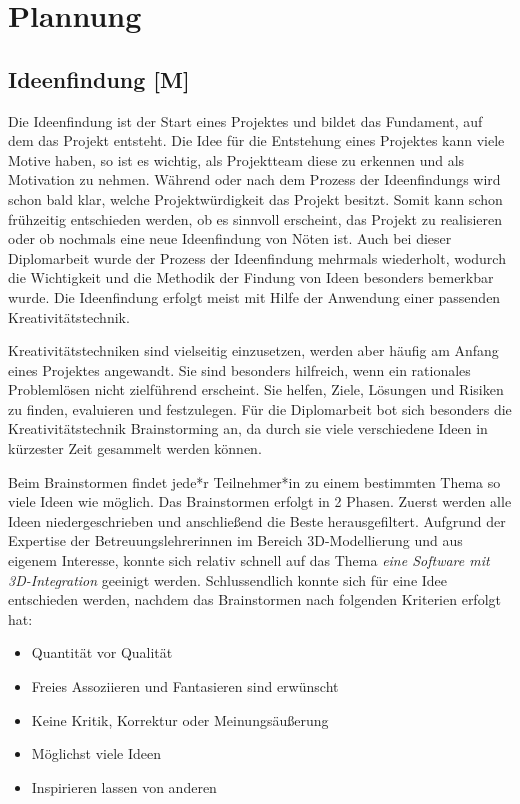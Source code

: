 \section{Plannung}

\subsection{Ideenfindung [M]}
Die Ideenfindung ist der Start eines Projektes und bildet das Fundament, auf dem das Projekt entsteht. Die Idee für die Entstehung eines Projektes kann viele Motive haben, so ist es wichtig, als Projektteam diese zu erkennen und als Motivation zu nehmen. Während oder nach dem Prozess der Ideenfindungs wird schon bald klar, welche Projektwürdigkeit das Projekt besitzt. Somit kann schon frühzeitig entschieden werden, ob es sinnvoll erscheint, das Projekt zu realisieren oder ob nochmals eine neue Ideenfindung von Nöten ist. Auch bei dieser Diplomarbeit wurde der Prozess der Ideenfindung mehrmals wiederholt, wodurch die Wichtigkeit und die Methodik der Findung von Ideen besonders bemerkbar wurde. Die Ideenfindung erfolgt meist mit Hilfe der Anwendung einer passenden Kreativitätstechnik.

Kreativitätstechniken sind vielseitig einzusetzen, werden aber häufig am Anfang eines Projektes angewandt. Sie sind besonders hilfreich, wenn ein rationales Problemlösen nicht zielführend erscheint. Sie helfen, Ziele, Lösungen und Risiken zu finden, evaluieren und festzulegen. Für die Diplomarbeit bot sich besonders die Kreativitätstechnik Brainstorming an, da durch sie viele verschiedene Ideen in kürzester Zeit gesammelt werden können.

Beim Brainstormen findet jede*r Teilnehmer*in zu einem bestimmten Thema so viele Ideen wie möglich. Das Brainstormen erfolgt in 2 Phasen. Zuerst werden alle Ideen niedergeschrieben und anschließend die Beste herausgefiltert. Aufgrund der Expertise der Betreuungslehrerinnen im Bereich 3D-Modellierung und aus eigenem Interesse, konnte sich relativ schnell auf das Thema \emph{eine Software mit 3D-Integration} geeinigt werden. Schlussendlich konnte sich für eine Idee entschieden werden, nachdem das Brainstormen nach folgenden Kriterien erfolgt hat:
\begin{itemize}
    \item Quantität vor Qualität
    \item Freies Assoziieren und Fantasieren sind erwünscht
    \item Keine Kritik, Korrektur oder Meinungsäußerung
    \item Möglichst viele Ideen
    \item Inspirieren lassen von anderen
\end{itemize}
\cite{Ideenfindung}

